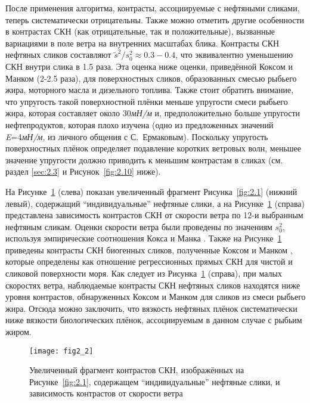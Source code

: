 После применения алгоритма, контрасты, ассоциируемые с нефтяными сликами, теперь систематически отрицательны. Также можно отметить другие особенности в контрастах СКН (как отрицательные, так и положительные), вызванные вариациями в поле ветра на внутренних масштабах блика. Контрасты СКН нефтяных сликов составляют $\tilde{s}^{2} /s_{0}^{2} \approx 0.3-0.4$, что эквивалентно уменьшению СКН внутри слика в 1.5 раза. Эта оценка ниже оценки, приведённой Коксом и Манком \citep{Cox1954a} (2-2.5 раза), для поверхностных сликов, образованных смесью рыбьего жира, моторного масла и дизельного топлива. Также стоит обратить внимание, что упругость такой поверхностной плёнки меньше упругости смеси рыбьего жира, которая составляет около 30\textit{мН/м} и, предположительно больше упругости нефтепродуктов, которая плохо изучена (одно из предложенных значений \textit{E}=4\textit{мН/м}, из личного общения с С.~Ермаковым). Поскольку упругость поверхностных плёнок определяет подавление коротких ветровых волн, меньшее значение упругости должно приводить к меньшим контрастам в сликах (см. раздел \ref{sec:2.3} и Рисунок~\ref{fig:2.10} ниже).

На Рисунке~\ref{fig:2.2} (слева) показан увеличенный фрагмент Рисунка~\ref{fig:2.1} (нижний левый), содержащий ``индивидуальные'' нефтяные слики, а на Рисунке~\ref{fig:2.2} (справа) представлена зависимость контрастов СКН от скорости ветра по 12-и выбранным нефтяным сликам. Оценки скорости ветра были проведены по значениям $s_{0}^{2} $, используя эмпирические соотношения Кокса и Манка \citep{Cox1954, Cox1954a}. Также на Рисунке~\ref{fig:2.2} приведены контрасты СКН биогенных сликов, полученные Коксом и Манком \citep{Cox1954a}, которые определены как отношение регрессионных прямых СКН для чистой и сликовой поверхности моря. Как следует из Рисунка~\ref{fig:2.2} (справа), при малых скоростях ветра, наблюдаемые контрасты СКН нефтяных сликов находятся ниже уровня контрастов, обнаруженных Коксом и Манком \citep{Cox1954, Cox1954a} для сликов из смеси рыбьего жира. Отсюда можно заключить, что вязкость нефтяных плёнок систематически ниже вязкости биологических плёнок, ассоциируемым в данном случае с рыбьим жиром.



\begin{figure}[!thb]
 \texttt{[image: fig2\_2]}
 \caption{Увеличенный фрагмент контрастов СКН, изображённых на Рисунке~\ref{fig:2.1}, содержащем ``индивидуальные'' нефтяные слики, и зависимость контрастов от скорости ветра}
 \label{fig:2.2}
\end{figure}


